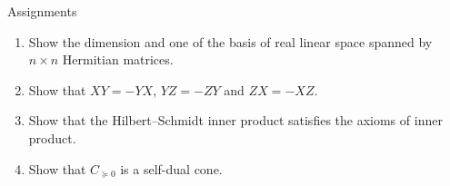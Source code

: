 \documentclass{beamer}
\theoremstyle{definition}
\begin{document}
\begin{frame}{Assignments}
\begin{enumerate}
\setlength{\itemsep}{2em}
\item Show the dimension and one of the basis of real linear space spanned by $n\times n$ Hermitian matrices.
\item Show that $XY=-YX$, $YZ=-ZY$ and $ZX=-XZ$.
\item Show that the Hilbert--Schmidt inner product satisfies the axioms of inner product.
\item Show that $C_{\succeq 0}$ is a self-dual cone.
\end{enumerate}
\end{frame}
\end{document}

